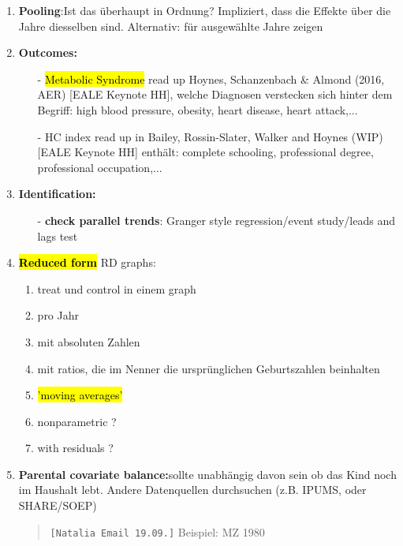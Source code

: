 \documentclass[11pt,a4paper]{article}
\begin{document}
\begin{enumerate}

\item \textbf{Pooling}:\newline Ist das  überhaupt in Ordnung? Impliziert, dass die Effekte über die Jahre diesselben sind. Alternativ: für ausgewählte	Jahre zeigen


\item \textbf{Outcomes: }\vspace{-1em}
\begin{itemize}
\item[-]\hl{Metabolic Syndrome} \newline read up Hoynes, Schanzenbach \& Almond (2016, AER) [EALE Keynote HH], welche Diagnosen verstecken sich hinter dem Begriff: high blood pressure, obesity, heart disease, heart attack,...
\item[-] HC index \newline read up in Bailey, Rossin-Slater, Walker and Hoynes (WIP) [EALE Keynote HH] enthält: complete schooling, professional degree, professional occupation,...
\end{itemize}



\item \textbf{Identification:}\vspace{-1em}
\begin{itemize}
\item[-]\textbf{check parallel trends}: Granger style regression/event study/leads and lags test
\end{itemize}


\item \textbf{\hl{Reduced form}}\newline 
RD graphs:\vspace{-1em}
\begin{enumerate}
\item treat und control in einem graph
\item pro Jahr
\item mit absoluten Zahlen
\item mit ratios, die im Nenner die ursprünglichen Geburtszahlen beinhalten
\item \hl{'moving averages'}
\item nonparametric ? 
\item with residuals ? 
\end{enumerate}
\item \textbf{Parental covariate balance:}\newline sollte unabhängig davon sein ob das Kind noch im Haushalt lebt. Andere Datenquellen durchsuchen (z.B. IPUMS, oder SHARE/SOEP)
\begin{quote}
\texttt{[Natalia Email 19.09.]}\newline
Beispiel: MZ 1980 


\end{quote}
\end{enumerate}
\end{document}
